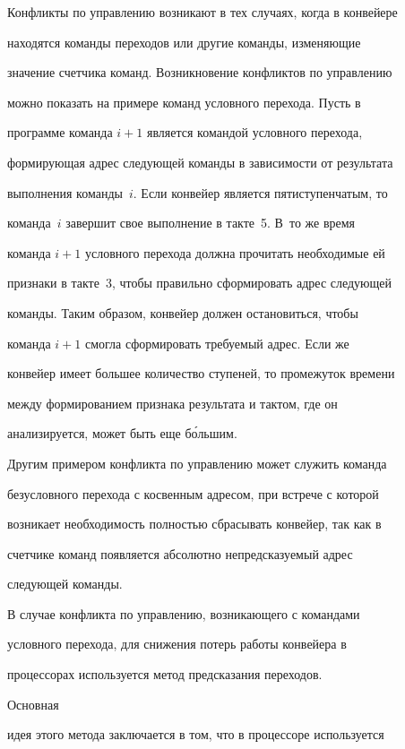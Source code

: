 Конфликты по управлению возникают в тех случаях, когда в конвейере 


находятся команды  переходов или другие команды, изменяющие 


значение счетчика команд. Возникновение конфликтов по управ\-ле\-нию 


можно показать на примере команд условного перехода. Пусть в 


программе команда $i+1$ является командой условного перехода, 


формирующая адрес следующей команды в зависимости от результата 


выполнения команды~$i$. Если конвейер является пятиступенчатым, то 


команда~$i$ завершит свое выполнение в такте~5.  В~то же время 


команда $i+1$ условного перехода должна прочитать необходимые ей 


признаки в такте~3, чтобы правильно сформировать адрес следующей 


команды. Таким образом, конвейер должен остановиться, чтобы 


команда $i+1$  смогла сформировать требуемый адрес. Если же 


конвейер имеет большее количество ступеней, то промежуток времени 


между формированием признака результата и тактом, где он 


анализируется, может быть еще б\'{о}льшим. 


 


 Другим примером конфликта по управ\-ле\-нию может служить команда 


безусловного перехода с косвенным адресом, при встрече с которой 


возникает необходимость полностью сбрасывать конвейер, так как в 


счетчике команд появляется абсолютно непредсказуемый адрес 


следующей команды.


  


В случае конфликта по управлению, возникающего с командами 


условного перехода, для снижения потерь работы конвейера в 


процессорах используется метод предсказания переходов. 


Основная 


идея этого метода заключается в том, что в процессоре используется 


